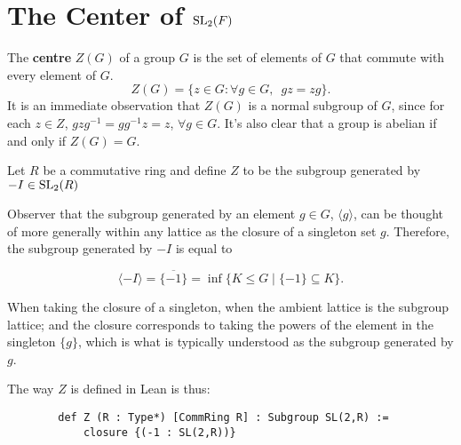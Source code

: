 \section{The Center of $\operatorname{SL}_2(F)$}

\begin{definition}
The \textbf{centre} $Z(G)$ of a group $G$ is the set of elements of  $G$ that commute with every element of $G$.
\begin {equation*} Z(G) = \{ z \in G : \forall g \in G, \hspace{6pt} gz=zg \}. \end{equation*}
It is an immediate observation that $Z(G)$ is a normal subgroup of $G$, 
since for each $z \in Z$, $gzg^{-1} = gg^{-1}z = z$, $\forall g \in G$. It's also clear that a group is abelian if and only if $Z(G)=G$.
\end{definition}

\begin{definition}
\label{SpecialSubgroups.Z}
\leanok
    Let $R$ be a commutative ring and define $Z$ to be the subgroup generated by $- I \in \operatorname{SL}_2(R)$
\end{definition}

\begin{remark}
    Observer that the subgroup generated by an element $g \in G$, $\langle g \rangle$, can be thought of more generally within any lattice as the closure of a singleton set ${g}$. Therefore, the subgroup generated by $-I$ is equal to
    
    \[\langle -I \rangle = \overline{\{-1\}} = \inf \{ K \le G \; | \; \{-1\} \subseteq K \}.\]

    When taking the closure of a singleton, when the ambient lattice is the subgroup lattice; and the closure corresponds to taking the powers of the element in the singleton $\{g\}$,
    which is what is typically understood as the subgroup generated by $g$.

    The way $Z$ is defined in Lean is thus:

    \begin{footnotesize} 
    \begin{verbatim}
        def Z (R : Type*) [CommRing R] : Subgroup SL(2,R) := 
            closure {(-1 : SL(2,R))}
    \end{verbatim}
    \end{footnotesize}

\end{remark}

